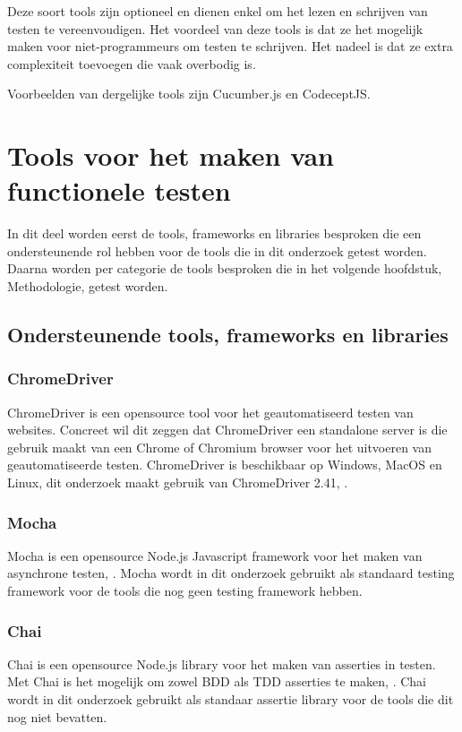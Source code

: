 Deze soort tools zijn optioneel en dienen enkel om het lezen en schrijven van testen te vereenvoudigen. Het voordeel van deze tools is dat ze het mogelijk maken voor niet-programmeurs om testen te schrijven. Het nadeel is dat ze extra complexiteit toevoegen die vaak overbodig is.

Voorbeelden van dergelijke tools zijn Cucumber.js en CodeceptJS.

\section{Tools voor het maken van functionele testen}
In dit deel worden eerst de tools, frameworks en libraries besproken die een ondersteunende rol hebben voor de tools die in dit onderzoek getest worden. Daarna worden per categorie de tools besproken die in het volgende hoofdstuk, Methodologie, getest worden.

\subsection{Ondersteunende tools, frameworks en libraries}

\subsubsection{ChromeDriver}
ChromeDriver is een opensource tool voor het geautomatiseerd testen van websites. Concreet wil dit zeggen dat ChromeDriver een standalone server is die gebruik maakt van een Chrome of Chromium browser voor het uitvoeren van geautomatiseerde testen. ChromeDriver is beschikbaar op Windows, MacOS en Linux, dit onderzoek maakt gebruik van ChromeDriver 2.41, \textcite{ChromeDriver2018}.

\subsubsection{Mocha}
Mocha is een opensource Node.js Javascript framework voor het maken van asynchrone testen, \autocite{Mocha}. Mocha wordt in dit onderzoek gebruikt als standaard testing framework voor de tools die nog geen testing framework hebben.

\subsubsection{Chai}
Chai is een opensource Node.js library voor het maken van asserties in testen. Met Chai is het mogelijk om zowel BDD als TDD asserties te maken, \autocite{Chai}. Chai wordt in dit onderzoek gebruikt als standaar assertie library voor de tools die dit nog niet bevatten.

